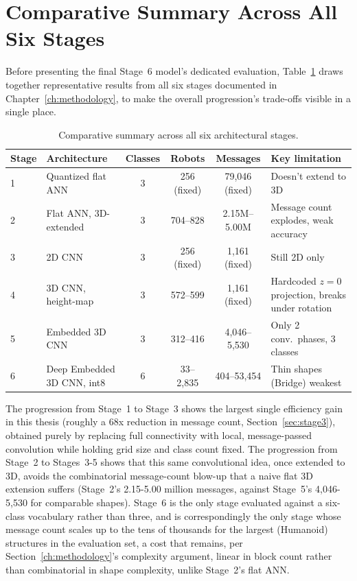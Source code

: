 \documentclass[12pt,a4paper]{report}
\begin{document}
\section{Comparative Summary Across All Six Stages}

Before presenting the final Stage~6 model's dedicated evaluation, Table~\ref{tab:comparative} draws together representative results from all six stages documented in Chapter~\ref{ch:methodology}, to make the overall progression's trade-offs visible in a single place.

\begin{table}[H]
    \centering
    \caption{Comparative summary across all six architectural stages.}
    \label{tab:comparative}
    \small
    \begin{tabular}{lp{2.3cm}cccp{3.2cm}}
        \toprule
        Stage & Architecture & Classes & Robots & Messages & Key limitation \\
        \midrule
        1 & Quantized flat ANN & 3 & 256 (fixed) & 79,046 (fixed) & Doesn't extend to 3D \\
        2 & Flat ANN, 3D-extended & 3 & 704--828 & 2.15M--5.00M & Message count explodes, weak accuracy \\
        3 & 2D CNN & 3 & 256 (fixed) & 1,161 (fixed) & Still 2D only \\
        4 & 3D CNN, height-map & 3 & 572--599 & 1,161 (fixed) & Hardcoded $z{=}0$ projection, breaks under rotation \\
        5 & Embedded 3D CNN & 3 & 312--416 & 4,046--5,530 & Only 2 conv.\ phases, 3 classes \\
        6 & Deep Embedded 3D CNN, int8 & 6 & 33--2,835 & 404--53,454 & Thin shapes (Bridge) weakest \\
        \bottomrule
    \end{tabular}
\end{table}

The progression from Stage~1 to Stage~3 shows the largest single efficiency gain in this thesis (roughly a 68x reduction in message count, Section~\ref{sec:stage3}), obtained purely by replacing full connectivity with local, message-passed convolution while holding grid size and class count fixed. The progression from Stage~2 to Stages~3-5 shows that this same convolutional idea, once extended to 3D, avoids the combinatorial message-count blow-up that a naive flat 3D extension suffers (Stage~2's 2.15-5.00 million messages, against Stage~5's 4,046-5,530 for comparable shapes). Stage~6 is the only stage evaluated against a six-class vocabulary rather than three, and is correspondingly the only stage whose message count scales up to the tens of thousands for the largest (Humanoid) structures in the evaluation set, a cost that remains, per Section~\ref{ch:methodology}'s complexity argument, linear in block count rather than combinatorial in shape complexity, unlike Stage~2's flat ANN.
\end{document}
